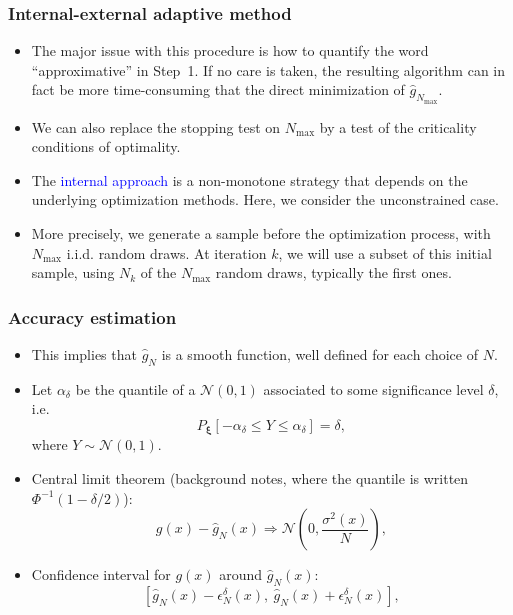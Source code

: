 \documentclass[aspectratio=169]{beamer}
\def\bxi{\boldsymbol\xi}
\def\cN{\mathcal{N}}
\begin{document}
\begin{frame}
\frametitle{Internal-external adaptive method}

\begin{itemize}
	\item 
The major issue with this procedure is how to quantify the word ``approximative'' in Step~1.
If no care is taken, the resulting algorithm can in fact be more time-consuming that the direct minimization of $\hat{g}_{N_{\max}}$.
\item
We can also replace the stopping test on $N_{\max}$ by a test of the criticality conditions of optimality.
\item 
The \textcolor{blue}{internal approach} is a non-monotone strategy that depends on the underlying optimization methods.
Here, we consider the unconstrained case.
\item 
More precisely, we generate a sample before the optimization process, with $N_{\max}$ i.i.d. random draws.
At iteration $k$, we will use a subset of this initial sample, using $N_k$ of the $N_{\max}$ random draws, typically the first ones.
\end{itemize}

\end{frame}

\begin{frame}
\frametitle{Accuracy estimation}

\begin{itemize}
	\item 
This implies that $\hat{g}_N$ is a smooth function, well defined for each choice of $N$.
\item
Let $\alpha_{\delta}$ be the quantile of a $\cN(0,1)$ associated to some significance level $\delta$, i.e.
$$
P_{\bxi} [ -\alpha_{\delta} \leq Y \leq \alpha_{\delta} ] = \delta,
$$
where $Y \sim \cN(0,1)$.
\item
Central limit theorem (background notes, where the quantile is written $\Phi^{-1}(1-\delta/2)$):
\[
g(x) - \hat{g}_N(x) \Rightarrow \cN \left( 0, \frac{\sigma^2(x)}{N} \right),
\]
\item
Confidence interval for $g(x)$ around $\hat{g}_N(x)$:
\[
[\hat{g}_N(x) - \epsilon^{\delta}_N(x),\ \hat{g}_N(x) + \epsilon^{\delta}_N(x)],
\]
\end{itemize}

\end{frame}
\end{document}
